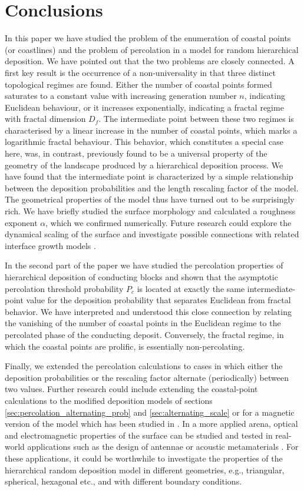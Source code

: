 \documentclass[amsmath,amssymb,amsfonts,aps,pre,preprint,superscriptaddress,bibnotes,showpacs,showkeys,longbibliography,nofootinbib]{revtex4-1}
\begin{document}
\section{Conclusions}

In this paper we have studied the problem of the enumeration of coastal points (or coastlines) and the problem of percolation in a model for random hierarchical deposition. We have pointed out that the two problems are closely connected. A first key result is the occurrence of a non-universality in that three distinct topological regimes are found. Either the number of coastal points formed saturates to a constant value with increasing generation number $n$, indicating Euclidean behaviour, or it increases exponentially, indicating a fractal regime with fractal dimension $D_f$. The intermediate point between these two regimes is characterised  by a linear increase in the number of coastal points, which marks a logarithmic fractal behaviour. This behavior, which constitutes a special case here, was, in contrast, previously found to be a universal property of the geometry of the landscape produced by a hierarchical deposition process. We have found that the intermediate point is characterized by a simple relationship between the deposition probabilities and the length rescaling factor of the model. The geometrical properties of the model thus have turned out to be surprisingly rich. We have briefly studied the surface morphology and calculated a roughness exponent $\alpha$, which we confirmed numerically. Future research could explore the dynamical scaling of the surface and investigate possible connections with related interface growth models \cite{Family_1985,KPZ}. 

In the second part of the paper we have studied the percolation properties of hierarchical deposition of conducting blocks and shown that the asymptotic percolation threshold probability $P_c$ is located at exactly the same intermediate-point value for the deposition probability that separates Euclidean from fractal behavior. We have interpreted and understood this close connection by relating the vanishing of the number of coastal points in the Euclidean regime to the percolated phase of the conducting deposit. Conversely, the fractal regime, in which the  coastal points are prolific, is essentially non-percolating. 

Finally, we extended the percolation calculations to cases in which either the deposition probabilities or the rescaling factor alternate (periodically) between two values. Further research could include extending the coastal-point calculations to the modified deposition models of sections \ref{sec:percolation_alternating_prob} and \ref{sec:alternating_scale} or for a magnetic version of the model which has been studied in \cite{magneticDeposition}. In a more applied arena, optical and electromagnetic properties of the surface can be studied and tested in real-world applications such as the design of antennae \cite{Kakkar2019} or acoustic metamaterials \cite{MAN2019}. For these applications, it could be worthwhile to investigate the properties of the hierarchical random deposition model in different geometries, e.g., triangular, spherical, hexagonal etc., and with different boundary conditions.
\end{document}
